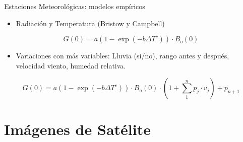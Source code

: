 \documentclass[xcolor={usenames,svgnames,dvipsnames}]{beamer}
\begin{document}
\begin{frame}[label=sec-2-6]{Estaciones Meteorológicas: modelos empíricos}
\begin{itemize}
\item Radiación y Temperatura (Bristow y Campbell)
\end{itemize}
\[
G(0) = a \left(1 - \exp(-b \Delta T^c)\right) \cdot B_o(0)
\]

\begin{itemize}
\item Variaciones con más variables: Lluvia (si/no), rango antes y después, velocidad viento, humedad relativa.
\end{itemize}

\[
  G(0) = a \left(1 - \exp(-b \Delta T^c)\right) \cdot B_o(0) \cdot \left(1 +
    \sum_1^n p_j \cdot v_j \right) + p_{n+1}
\]

\nocite{Antonanzas-Torres.Sanz-Garcia.ea2013}
\end{frame}
\section{Imágenes de Satélite}
\label{sec-3}
\end{document}

